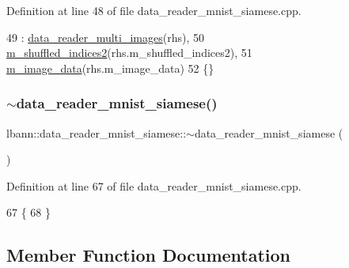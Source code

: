 Definition at line 48 of file data\+\_\+reader\+\_\+mnist\+\_\+siamese.\+cpp.


\begin{DoxyCode}
49   : \hyperlink{classlbann_1_1data__reader__multi__images_a91725ae909007b26410837257aa921dc}{data\_reader\_multi\_images}(rhs),
50     \hyperlink{classlbann_1_1data__reader__mnist__siamese_a42a4b1513a7305cc62d219ac0d9473c3}{m\_shuffled\_indices2}(rhs.m\_shuffled\_indices2),
51     \hyperlink{classlbann_1_1data__reader__mnist__siamese_a5b664a53047546c1be6d19ecabbd30dc}{m\_image\_data}(rhs.m\_image\_data)
52 \{\}
\end{DoxyCode}
\mbox{\label{classlbann_1_1data__reader__mnist__siamese_a308c0ac052f218a52da40043164fab1b}} 
\subsubsection{\texorpdfstring{$\sim$data\+\_\+reader\+\_\+mnist\+\_\+siamese()}{~data\_reader\_mnist\_siamese()}}
{\footnotesize\ttfamily lbann\+::data\+\_\+reader\+\_\+mnist\+\_\+siamese\+::$\sim$data\+\_\+reader\+\_\+mnist\+\_\+siamese (\begin{DoxyParamCaption}{ }\end{DoxyParamCaption})\hspace{0.3cm}{\ttfamily [override]}}



Definition at line 67 of file data\+\_\+reader\+\_\+mnist\+\_\+siamese.\+cpp.


\begin{DoxyCode}
67                                                       \{
68 \}
\end{DoxyCode}


\subsection{Member Function Documentation}
\mbox{\label{classlbann_1_1data__reader__mnist__siamese_a0b9750c72f9fdb28499b6dfe70bc9a6f}} 
